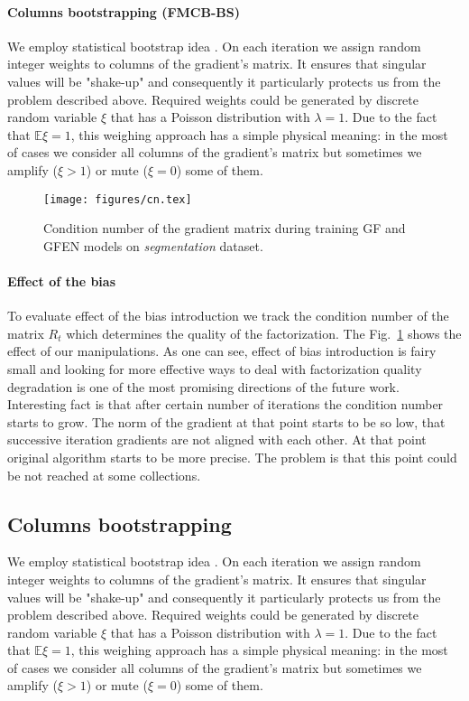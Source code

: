 \documentclass{article}
\begin{document}
\paragraph{Columns bootstrapping (FMCB-BS)}
We employ statistical bootstrap idea \cite{Efron1992bootstrap}. On each iteration we assign random integer weights to columns of the gradient's matrix. It ensures that singular values will be "shake-up" and consequently it particularly protects us from the problem described above. Required weights could be generated by discrete random variable $\xi$ that has a Poisson distribution with $\lambda = 1$. Due to the fact that $\mathbb{E} \xi = 1$, this weighing approach has a simple physical meaning: in the most of cases we consider all columns of the gradient's matrix but sometimes we amplify ($\xi > 1$) or mute ($\xi = 0$) some of them.

\begin{figure}
\vskip 0.2in
\begin{center}
\centerline{\texttt{[image: figures/cn.tex]}}
\caption{Condition number of the gradient matrix during training GF and GFEN models on \emph{segmentation} dataset.}
\end{center}
\label{fig:condition_number}
\vskip -0.2in
\end{figure}

\paragraph{Effect of the bias}
To evaluate effect of the bias introduction we track the condition number of the matrix $R_t$ which determines the quality of the factorization. The Fig.~\ref{fig:condition_number} shows the effect of our manipulations. As one can see, effect of bias introduction is fairy small and looking for more effective ways to deal with factorization quality degradation is one of the most promising directions of the future work. Interesting fact is that after certain number of iterations the condition number starts to grow. The norm of the gradient at that point starts to be so low, that successive iteration gradients are not aligned with each other. At that point original algorithm starts to be more precise. The problem is that this point could be not reached at some collections.

\subsection{Columns bootstrapping}
We employ statistical bootstrap idea \cite{Efron1992bootstrap}. On each iteration we assign random integer weights to columns of the gradient's matrix. It ensures that singular values will be "shake-up" and consequently it particularly protects us from the problem described above. Required weights could be generated by discrete random variable $\xi$ that has a Poisson distribution with $\lambda = 1$. Due to the fact that $\mathbb{E} \xi = 1$, this weighing approach has a simple physical meaning: in the most of cases we consider all columns of the gradient's matrix but sometimes we amplify ($\xi > 1$) or mute ($\xi = 0$) some of them.
\end{document}
